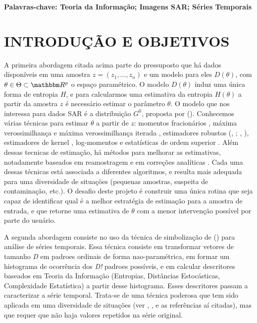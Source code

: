 \documentclass[12pt,letterpaper]{article}
\begin{document}
\textbf{Palavras-chave: Teoria da Informação; Imagens SAR; Séries Temporais} 
  
  \newpage
\section*{\centering \textbf{INTRODUÇÃO E OBJETIVOS}} %

A primeira abordagem citada acima parte do pressuposto que há dados disponíveis em uma amostra $z = (z_1,\dots, z_n)$ e um modelo para eles $D(\theta)$, com $\theta \in \Theta \subset \mathbbm R ^ p$ o espaço paramétrico. O modelo $D(\theta)$ induz uma única forma de entropia $H$, e para calcularmos uma estimativa da entropia $H(\theta)$ a partir da amostra $z$ é necessário estimar o parâmetro $\theta$. O modelo que nos interessa para dados SAR é a distribuição $G^0$, proposta por  (\citeyear{FreryMullerYanasse1997}). Conhecemos várias técnicas para estimar $\theta$ a partir de $z$: momentos fracionários \cite{MejailBerllesFreryBustos2003}, máxima verossimilhança e máxima verossimilhança iterada \cite{FreryNetoSouza2004}, estimadores robustos (, \citeyear{BustusLuciniFrery2002}; , \citeyear{AllendeFreryGalbiatiPizarro2006}), estimadores de kernel \cite{GambiniCassettiLuciniFrery2014}, log-momentos e estatísticas de ordem superior \cite{DengLopez2016}. Além dessas tecnicas de estimação, há métodos para melhorar as estimativas, notadamente baseados em reamostragem \cite{CribariFrerySilva2002} e em correções analíticas \cite{SilvaNetoFrery2008}. Cada uma dessas técnicas está associada a diferentes algoritmos, e resulta mais adequada para uma diversidade de situações (pequenas amostras, suspeita de contaminação, etc.). O desafio deste projeto é construir uma única rotina que seja capaz de identificar qual é a melhor estratégia de estimação para a amostra de entrada, e que retorne uma estimativa de $\theta$ com a menor intervenção possível por parte do usuário.

A segunda abordagem consiste no uso da técnica de simbolização de  (\citeyear{BandtPompe2002}) para análise de séries temporais. Essa técnica consiste em transformar vetores de tamanho \textit{D} em padroes ordinais de forma nao-paramétrica, em formar um histograma de ocorrência dos \textit{D!} padroes possíveis, e em calcular descritores baseados em Teoria da Informação (Entropias, Distâncias Estocásticas, Complexidade Estatística) a partir desse histograma. Esses descritores passam a caracterizar a série temporal. Trata-se de uma técnica poderosa que tem sido aplicada em uma diversidade de situações (ver , \citeyear{RossoOspinaFrery2016}, e as referências aí citadas), mas que requer que não haja valores repetidos na série original.
\end{document}
